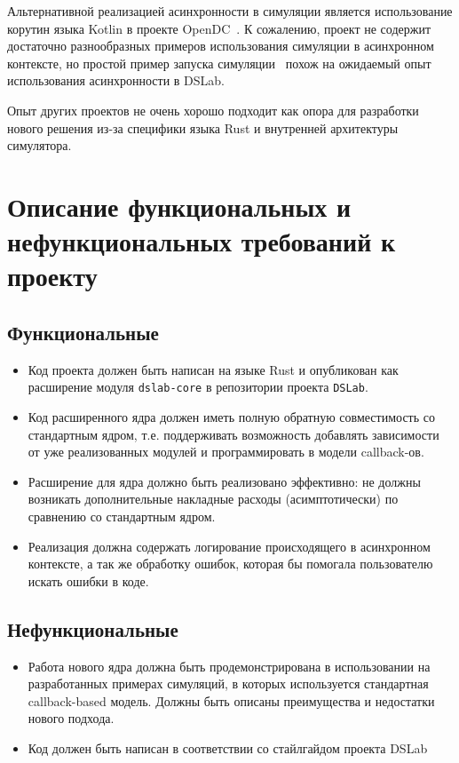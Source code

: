 Альтернативной реализацией асинхронности в симуляции является использование корутин языка Kotlin в проекте OpenDC~\cite{opendc-repo}\cite{opendc-article}. К сожалению, проект не содержит достаточно разнообразных примеров использования симуляции в асинхронном контексте, но простой пример запуска симуляции~\cite{opendc-example} похож на ожидаемый опыт использования асинхронности в DSLab.


Опыт других проектов не очень хорошо подходит как опора для разработки нового решения из-за специфики языка Rust и внутренней архитектуры симулятора.

\section{Описание функциональных и нефункциональных требований к проекту}\label{requirements}

\subsection{Функциональные}
\begin{itemize}
    \item Код проекта должен быть написан на языке Rust и опубликован как расширение модуля \texttt{dslab-core} в репозитории проекта \texttt{DSLab}\cite{dslab-repo}.
    \item Код расширенного ядра должен иметь полную обратную совместимость со стандартным ядром, т.е. поддерживать возможность добавлять зависимости от уже реализованных модулей и программировать в модели callback-ов.
    \item Расширение для ядра должно быть реализовано эффективно: не должны возникать дополнительные накладные расходы (асимптотически) по сравнению со стандартным ядром.
    \item Реализация должна содержать логирование происходящего в асинхронном контексте, а так же обработку ошибок, которая бы помогала пользователю искать ошибки в коде. 
\end{itemize}

\subsection{Нефункциональные}
\begin{itemize}
    \item Работа нового ядра должна быть продемонстрирована в использовании на разработанных примерах симуляций, в которых используется стандартная callback-based модель. Должны быть описаны преимущества и недостатки нового подхода.
    \item Код должен быть написан в соответствии со стайлгайдом проекта DSLab
\end{itemize}




